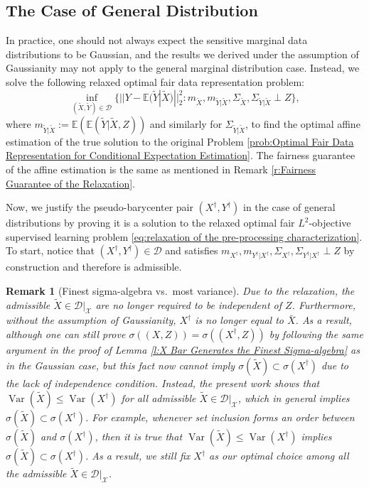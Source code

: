 \documentclass[twoside,11pt]{article}
\newtheorem{rema}{Remark}[section]{\bfseries}{\itshape}
\DeclareMathOperator{\var}{Var}
\begin{document}
\subsection{The Case of General Distribution} \label{s:The Case of General Distribution}

In practice, one should not always expect the sensitive marginal data distributions to be Gaussian, and the results we derived under the assumption of Gaussianity may not apply to the general marginal distribution case. Instead, we solve the following relaxed optimal fair data representation problem:
\begin{equation} \label{eq:relaxation of the pre-processing characterization}
\inf_{(\tilde{X},\tilde{Y}) \in \mathcal{D}}  \{ ||Y - \mathbb{E}(\tilde{Y}|\tilde{X})||^2_2: m_{\tilde{X}}, m_{\tilde{Y}|\tilde{X}}, \Sigma_{\tilde{X}}, \Sigma_{\tilde{Y}|\tilde{X}} \perp Z\},
\end{equation}
where $m_{\tilde{Y}|\tilde{X}} := \mathbb{E}(\mathbb{E}(\tilde{Y}|\tilde{X},Z))$ and similarly for $\Sigma_{\tilde{Y}|\tilde{X}}$,  to find the optimal affine estimation of the true solution to the original Problem \ref{prob:Optimal Fair Data Representation for Conditional Expectation Estimation}. The fairness guarantee of the affine estimation is the same as mentioned in Remark \ref{r:Fairness Guarantee of the Relaxation}.

Now, we justify the pseudo-barycenter pair $(X^{\dag}, Y^{\dag})$ in the case of general distributions by proving it is a solution to the relaxed optimal fair $L^2$-objective supervised learning problem \eqref{eq:relaxation of the pre-processing characterization}.  To start, notice that $(X^{\dag}, Y^{\dag}) \in \mathcal{D}$ and satisfies $m_{X^{\dag}}, m_{Y^{\dag}|X^{\dag}}, \Sigma_{X^{\dag}}, \Sigma_{Y^{\dag}|X^{\dag}} \perp Z$ by construction and therefore is admissible.

\begin{rema}[Finest sigma-algebra vs.\ most variance] \label{r:Finest Sigma Algebra vs. Most Variance}
Due to the relaxation, the admissible $\tilde{X} \in \mathcal{D}|_\mathcal{X}$ are no longer required to be independent of $Z$. Furthermore, without the assumption of Gaussianity, $X^{\dag}$ is no longer equal to $\bar{X}$. As a result, although one can still prove $\sigma((X,Z)) = \sigma((X^{\dag},Z))$ by following the same argument in the proof of Lemma \ref{l:X Bar Generates the Finest Sigma-algebra} as in the Gaussian case, but this fact now cannot imply $\sigma(\tilde{X}) \subset \sigma(X^{\dag})$ due to the lack of independence condition. Instead, the present work shows that $\var(\tilde{X}) \leq \var(X^{\dag})$ for all admissible $\tilde{X} \in \mathcal{D}|_{\mathcal{X}}$, which in general implies $\sigma(\tilde{X}) \subset \sigma(X^{\dag})$. For example, whenever set inclusion forms an order between $\sigma(\tilde{X})$ and $\sigma(X^{\dag})$, then it is true that $\var(\tilde{X}) \leq \var(X^{\dag})$ implies $\sigma(\tilde{X}) \subset \sigma(X^{\dag})$. As a result, we still fix $X^{\dag}$ as our optimal choice among all the admissible $\tilde{X} \in \mathcal{D}|_{\mathcal{X}}$.
\end{rema}
\end{document}
